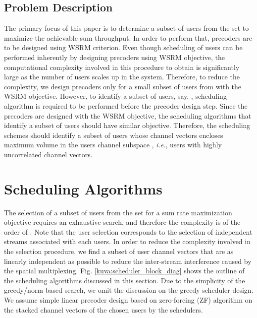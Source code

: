 \documentclass[conference,letterpaper,9pt]{./../IEEEtran}
\begin{document}
\subsection{Problem Description}
The primary focus of this paper is to determine a subset of users from the set  to maximize the achievable sum throughput. In order to perform that, precoders are to be designed using \ac{WSRM} criterion. Even though scheduling of users can be performed inherently by designing precoders using \ac{WSRM} objective, the computational complexity involved in this procedure to obtain  is significantly large as the number of users scales up in the system. Therefore, to reduce the complexity, we design precoders only for a small subset of users from  with the \ac{WSRM} objective. However, to identify a subset of users, say, , scheduling algorithm is required to be performed before the precoder design step. Since the precoders are designed with the \ac{WSRM} objective, the scheduling algorithms that identify a subset of users should have similar objective. Therefore, the scheduling schemes should identify a subset of users whose channel vectors encloses maximum volume in the users channel subspace \cite{jin2010novel}, \textit{i.e.}, users with highly uncorrelated channel vectors.

\section{Scheduling Algorithms}
\label{sec:sched_discussions}
The selection of a subset of users  from the set  for a sum rate maximization objective requires an exhaustive search, and therefore the complexity is of the order of  \cite{sun2009eigenmode}. Note that the user selection corresponds to the selection of independent streams associated with each users. In order to reduce the complexity involved in the selection procedure, we find a subset of user channel vectors that are as linearly independent as possible to reduce the inter-stream interference caused by the spatial multiplexing. Fig. \ref{kuva:scheduler_block_diag} shows the outline of the scheduling algorithms discussed in this section. Due to the simplicity of the greedy/norm based search, we omit the discussion on the greedy scheduler design. We assume simple linear precoder design based on zero-forcing (ZF) algorithm on the stacked channel vectors of the chosen users by the schedulers.
\end{document}
